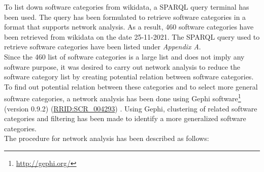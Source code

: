 To list down software categories from wikidata, a \ac{SPARQL} query terminal has been used. The query has been formulated to retrieve software categories in a format that supports network analysis. As a result, 460 software categories have been retrieved from wikidata on the date 25-11-2021. The \ac{SPARQL} query used to retrieve software categories have been listed under \emph{Appendix A}.\\

Since the 460 list of software categories is a large list and does not imply any software purpose, it was desired to carry out network analysis to reduce the software category list by creating potential relation between software categories. To find out potential relation between these categories and to select more general software categories, a network analysis has been done using Gephi software\footnote{\url{http://gephi.org/}} (version 0.9.2) (\href{https://scicrunch.org/resolver/SCR_004293}{RRID:SCR\_004293}) . Using Gephi, clustering of related software categories and filtering has been made to identify a more generalized software categories. \\

\noindent The procedure for network analysis has been described as follows:

